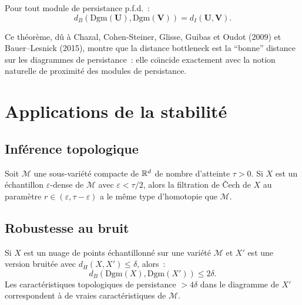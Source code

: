 \begin{theoreme}
Pour tout module de persistance p.f.d.~:
\[
  d_B(\mathrm{Dgm}(\mathbf{U}), \mathrm{Dgm}(\mathbf{V}))
  = d_I(\mathbf{U}, \mathbf{V}).
\]
\end{theoreme}

\begin{remarque}
Ce th\'eor\`eme, d\^u \`a Chazal, Cohen-Steiner, Glisse, Guibas et
Oudot (2009) et Bauer--Lesnick (2015), montre que la distance bottleneck
est la ``bonne'' distance sur les diagrammes de persistance~: elle
co\"{\i}ncide exactement avec la notion naturelle de proximit\'e des
modules de persistance.
\end{remarque}

\section{Applications de la stabilit\'e}

\subsection{Inf\'erence topologique}

\begin{theoreme}
Soit $\mathcal{M}$ une sous-vari\'et\'e compacte de $\mathbb{R}^d$ de nombre
d'atteinte $\tau > 0$. Si $X$ est un \'echantillon $\varepsilon$-dense
de $\mathcal{M}$ avec $\varepsilon < \tau / 2$, alors la filtration de
\v{C}ech de $X$ au param\`etre $r \in (\varepsilon, \tau - \varepsilon)$
a le m\^eme type d'homotopie que $\mathcal{M}$.
\end{theoreme}

\subsection{Robustesse au bruit}

\begin{proposition}
Si $X$ est un nuage de points \'echantillonn\'e sur une vari\'et\'e
$\mathcal{M}$ et $X'$ est une version bruit\'ee avec
$d_H(X, X') \leq \delta$, alors~:
\[
  d_B(\mathrm{Dgm}(X), \mathrm{Dgm}(X')) \leq 2\delta.
\]
Les caract\'eristiques topologiques de persistance $> 4\delta$ dans le
diagramme de $X'$ correspondent \`a de vraies caract\'eristiques de
$\mathcal{M}$.
\end{proposition}

